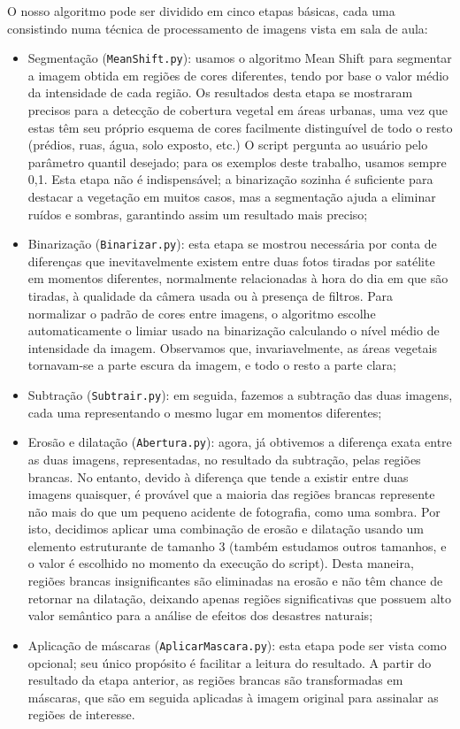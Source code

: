 \documentclass{article}
\begin{document}
O nosso algoritmo pode ser dividido em cinco etapas básicas, cada uma consistindo numa técnica de processamento de imagens vista em sala de aula:
\begin{itemize}
  \item Segmentação (\texttt{MeanShift.py}): usamos o algoritmo Mean Shift para segmentar a imagem obtida em regiões de cores diferentes, tendo por base o valor médio da intensidade de cada região. Os resultados desta etapa se mostraram precisos para a detecção de cobertura vegetal em áreas urbanas, uma vez que estas têm seu próprio esquema de cores facilmente distinguível de todo o resto (prédios, ruas, água, solo exposto, etc.) O script pergunta ao usuário pelo parâmetro quantil desejado; para os exemplos deste trabalho, usamos sempre 0,1. Esta etapa não é indispensável; a binarização sozinha é suficiente para destacar a vegetação em muitos casos, mas a segmentação ajuda a eliminar ruídos e sombras, garantindo assim um resultado mais preciso;
  \item Binarização (\texttt{Binarizar.py}): esta etapa se mostrou necessária por conta de diferenças que inevitavelmente existem entre duas fotos tiradas por satélite em momentos diferentes, normalmente relacionadas à hora do dia em que são tiradas, à qualidade da câmera usada ou à presença de filtros. Para normalizar o padrão de cores entre imagens, o algoritmo escolhe automaticamente o limiar usado na binarização calculando o nível médio de intensidade da imagem. Observamos que, invariavelmente, as áreas vegetais tornavam-se a parte escura da imagem, e todo o resto a parte clara;
  \item Subtração (\texttt{Subtrair.py}): em seguida, fazemos a subtração das duas imagens, cada uma representando o mesmo lugar em momentos diferentes;
  \item Erosão e dilatação (\texttt{Abertura.py}): agora, já obtivemos a diferença exata entre as duas imagens, representadas, no resultado da subtração, pelas regiões brancas. No entanto, devido à diferença que tende a existir entre duas imagens quaisquer, é provável que a maioria das regiões brancas represente não mais do que um pequeno acidente de fotografia, como uma sombra. Por isto, decidimos aplicar uma combinação de erosão e dilatação usando um elemento estruturante de tamanho 3 (também estudamos outros tamanhos, e o valor é escolhido no momento da execução do script). Desta maneira, regiões brancas insignificantes são eliminadas na erosão e não têm chance de retornar na dilatação, deixando apenas regiões significativas que possuem alto valor semântico para a análise de efeitos dos desastres naturais;
  \item Aplicação de máscaras (\texttt{AplicarMascara.py}): esta etapa pode ser vista como opcional; seu único propósito é facilitar a leitura do resultado. A partir do resultado da etapa anterior, as regiões brancas são transformadas em máscaras, que são em seguida aplicadas à imagem original para assinalar as regiões de interesse.
\end{itemize}
\end{document}
